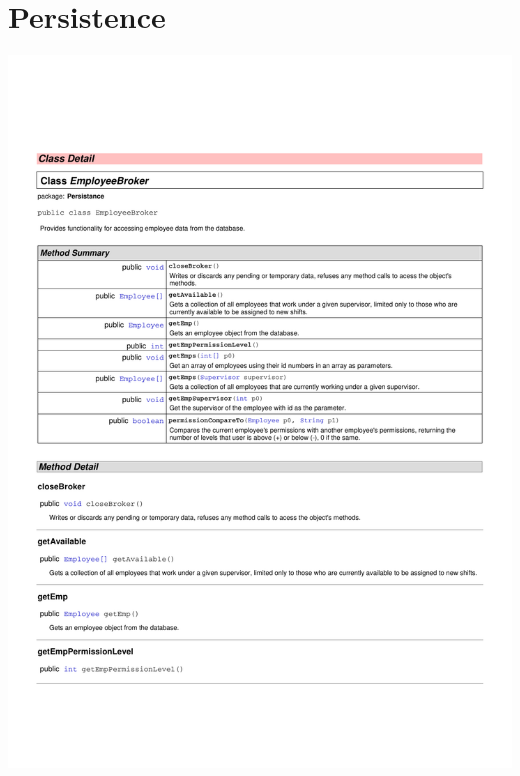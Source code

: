 \documentclass[letterpaper,12pt]{report}
\begin{document}
\section{Persistence}
\includegraphics[scale=0.9,trim=10mm 30mm 25mm 35mm]{externals/PersistanceDataDictionary1.pdf}
\newpage
\end{document}
